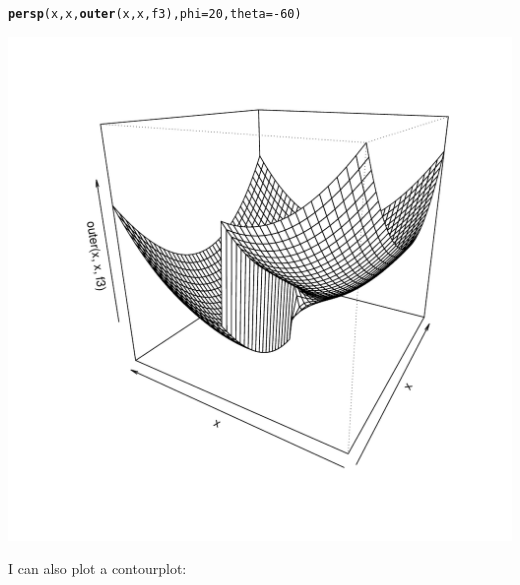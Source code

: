 \documentclass[11pt]{article}\usepackage[]{graphicx}\usepackage[]{color}
\makeatletter
\def\maxwidth{ %
  \ifdim\Gin@nat@width>\linewidth
    \linewidth
  \else
    \Gin@nat@width
  \fi
}
\newcommand{\hlnum}[1]{\textcolor[rgb]{0.686,0.059,0.569}{#1}}%
\newcommand{\hlopt}[1]{\textcolor[rgb]{0,0,0}{#1}}%
\newcommand{\hlstd}[1]{\textcolor[rgb]{0.345,0.345,0.345}{#1}}%
\newcommand{\hlkwc}[1]{\textcolor[rgb]{0.333,0.667,0.333}{#1}}%
\newcommand{\hlkwd}[1]{\textcolor[rgb]{0.737,0.353,0.396}{\textbf{#1}}}%
\newenvironment{kframe}{%
 \def\at@end@of@kframe{}%
 \ifinner\ifhmode%
  \def\at@end@of@kframe{\end{minipage}}%
  \begin{minipage}{\columnwidth}%
 \fi\fi%
 \def\FrameCommand##1{\hskip\@totalleftmargin \hskip-\fboxsep
 \colorbox{shadecolor}{##1}\hskip-\fboxsep
     \hskip-\linewidth \hskip-\@totalleftmargin \hskip\columnwidth}%
 \MakeFramed {\advance\hsize-\width
   \@totalleftmargin\z@ \linewidth\hsize
   \@setminipage}}%
 {\par\unskip\endMakeFramed%
 \at@end@of@kframe}
\newenvironment{knitrout}{}{} %
\makeatother
\begin{document}
\begin{knitrout}
\color{fgcolor}\begin{kframe}
\begin{alltt}
\hlkwd{persp}\hlstd{(x,x,}\hlkwd{outer}\hlstd{(x,x,f3),}\hlkwc{phi}\hlstd{=}\hlnum{20}\hlstd{,}\hlkwc{theta}\hlstd{=}\hlopt{-}\hlnum{60}\hlstd{)}
\end{alltt}
\end{kframe}
\includegraphics[width=\maxwidth]{figure/unnamed-chunk-18-1} 

\end{knitrout}
I can also plot a contourplot:
\end{document}
